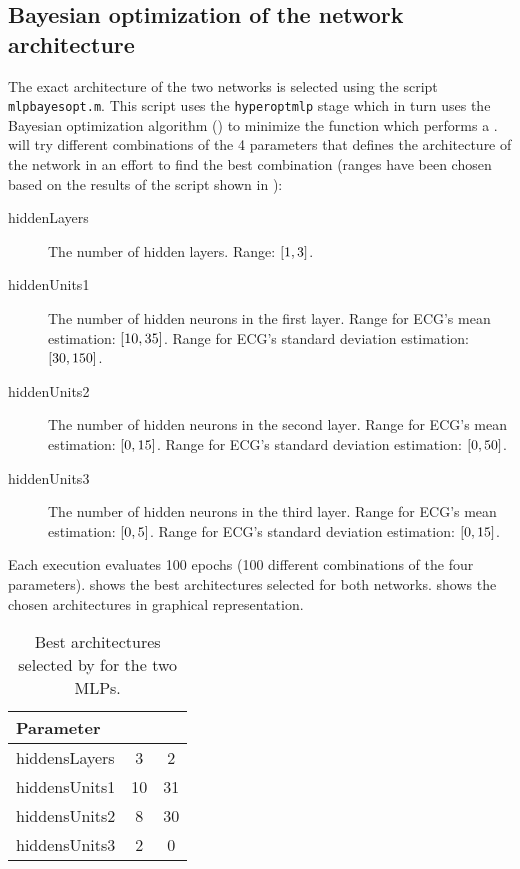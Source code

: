 

\subsection{Bayesian optimization of the network
architecture}\label{subsec:mlpbayesopt}

The exact architecture of the two networks is selected using the script
\texttt{mlpbayesopt.m}. This script uses the \texttt{hyperoptmlp} stage which
in turn uses the Bayesian optimization algorithm () to minimize
the  function which performs a .  will try different combinations of the 4
parameters that defines the architecture of the network in an effort to find
the best combination (ranges have been chosen based on the results of the
 script shown in ):
\begin{description}
\item[hiddenLayers] The number of hidden layers. Range:
	\(\interval{1}{3}\).
\item[hiddenUnits1] The number of hidden neurons in the first layer. Range for
	ECG's mean estimation: \(\interval{10}{35}\). Range for ECG's standard
	deviation estimation: \(\interval{30}{150}\).
\item[hiddenUnits2] The number of hidden neurons in the second layer. Range for
	ECG's mean estimation: \(\interval{0}{15}\). Range for ECG's standard
	deviation estimation: \(\interval{0}{50}\).
\item[hiddenUnits3] The number of hidden neurons in the third layer. Range for
	ECG's mean estimation: \(\interval{0}{5}\). Range for ECG's standard
	deviation estimation: \(\interval{0}{15}\).
\end{description}

Each  execution evaluates 100 epochs (100 different combinations
of the four parameters).  shows the best
architectures selected for both networks.  shows the
chosen architectures in graphical representation.

\begin{table}[hbtp]
	\centering
	\begin{tabular}{|l|c|c|}
		\toprule
		Parameter & \standout{ECG mean} & \standout{ECG stddev} \\
		\midrule
		hiddensLayers & 3 & 2 \\
		hiddensUnits1 & 10 & 31 \\
		hiddensUnits2 & 8 & 30 \\
		hiddensUnits3 & 2 & 0 \\
		\bottomrule
	\end{tabular}
	\caption{Best architectures selected by  for the two
	MLPs.}\label{table:mlpbayesopt}
\end{table}

